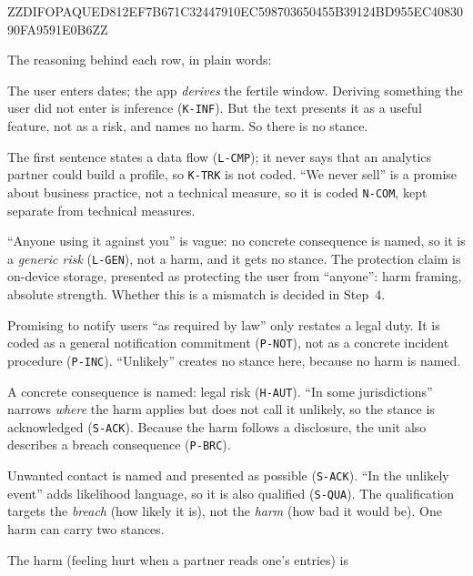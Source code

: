 \documentclass[twoside,its]{bossthesis}
\begin{document}
ZZDIFOPAQUED812EF7B671C32447910EC598703650455B39124BD955EC4083090FA9591E0B6ZZ



\noindent The reasoning behind each row, in plain words:

\begin{description}[leftmargin=0pt,itemsep=3pt]
  \item[U1.] The user enters dates; the app \emph{derives} the fertile window.
    Deriving something the user did not enter is inference (\texttt{K-INF}).
    But the text presents it as a useful feature, not as a risk, and names no
    harm. So there is no stance.
  \item[U2.] The first sentence states a data flow (\texttt{L-CMP}); it never
    says that an analytics partner could build a profile, so \texttt{K-TRK} is
    not coded.
    \enquote{We never sell} is a promise about business practice, not a
    technical measure, so it is coded \texttt{N-COM}, kept separate from
    technical measures.
  \item[U3.] \enquote{Anyone using it against you} is vague: no concrete
    consequence is named, so it is a \emph{generic risk} (\texttt{L-GEN}), not
    a harm, and it gets no stance. The protection claim is on-device storage,
    presented as protecting the user from \enquote{anyone}: harm framing,
    absolute strength. Whether this is a mismatch is decided in Step~4.
  \item[U4.] Promising to notify users \enquote{as required by law} only
    restates a legal duty. It is coded as a general notification commitment
    (\texttt{P-NOT}), not as a concrete incident procedure (\texttt{P-INC}).
    \enquote{Unlikely} creates no stance here, because no harm is named.
  \item[U5.] A concrete consequence is named: legal risk (\texttt{H-AUT}).
    \enquote{In some jurisdictions} narrows \emph{where} the harm applies but
    does not call it unlikely, so the stance is acknowledged (\texttt{S-ACK}).
    Because the harm follows a disclosure, the unit also describes a breach
    consequence (\texttt{P-BRC}).
  \item[U6.] Unwanted contact is named and presented as possible
    (\texttt{S-ACK}). \enquote{In the unlikely event} adds likelihood language,
    so it is also qualified (\texttt{S-QUA}). The qualification targets the
    \emph{breach} (how likely it is), not the \emph{harm} (how bad it would
    be). One harm can carry two stances.
  \item[U7.] The harm (feeling hurt when a partner reads one's entries) is

\end{description}
\end{document}
